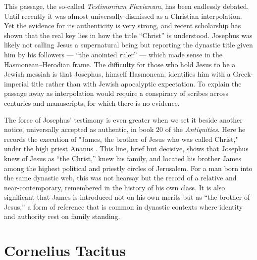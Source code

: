 This passage, the so-called \emph{Testimonium Flavianum}, has been endlessly debated.
Until recently it was almost universally dismissed as a Christian interpolation.
Yet the evidence for its authenticity is very strong, and recent scholarship has shown that the real key lies in how the title “Christ” is understood.
Josephus was likely not calling Jesus a supernatural being but reporting the dynastic title given him by his followers --- “the anointed ruler” --- which made sense in the Hasmonean--Herodian frame.
The difficulty for those who hold Jesus to be a Jewish messiah is that Josephus, himself Hasmonean, identifies him with a Greek-imperial title rather than with Jewish apocalyptic expectation.
To explain the passage away as interpolation would require a conspiracy of scribes across centuries and manuscripts, for which there is no evidence.

The force of Josephus’ testimony is even greater when we set it beside another notice, universally accepted as authentic, in book 20 of the \emph{Antiquities}.
Here he records the execution of "James, the brother of Jesus who was called Christ," under the high priest Ananus \cite[20.200]{josephus:ant}.
This line, brief but decisive, shows that Josephus knew of Jesus as “the Christ,” knew his family, and located his brother James among the highest political and priestly circles of Jerusalem.
For a man born into the same dynastic web, this was not hearsay but the record of a relative and near-contemporary, remembered in the history of his own class.
It is also significant that James is introduced not on his own merits but as “the brother of Jesus,” a form of reference that is common in dynastic contexts where identity and authority rest on family standing.

\section{Cornelius Tacitus}\label{sec:cornelius-tacitus}

